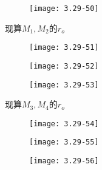 		\begin{figure}[H] %
	\begin{minipage}{\linewidth}
		\texttt{[image: 3.29-50]}
	\end{minipage}
\end{figure}

现算$M_1,M_2$的$r_o$

		\begin{figure}[H] %
	\begin{minipage}{\linewidth}
		\texttt{[image: 3.29-51]}
	\end{minipage}
\end{figure}

		\begin{figure}[H] %
	\begin{minipage}{\linewidth}
		\texttt{[image: 3.29-52]}
	\end{minipage}
\end{figure}

		\begin{figure}[H] %
	\begin{minipage}{\linewidth}
		\texttt{[image: 3.29-53]}
	\end{minipage}
\end{figure}






现算$M_3,M_4$的$r_o$

		\begin{figure}[H] %
	\begin{minipage}{\linewidth}
		\texttt{[image: 3.29-54]}
	\end{minipage}
\end{figure}

		\begin{figure}[H] %
	\begin{minipage}{\linewidth}
		\texttt{[image: 3.29-55]}
	\end{minipage}
\end{figure}

		\begin{figure}[H] %
	\begin{minipage}{\linewidth}
		\texttt{[image: 3.29-56]}
	\end{minipage}
\end{figure}


